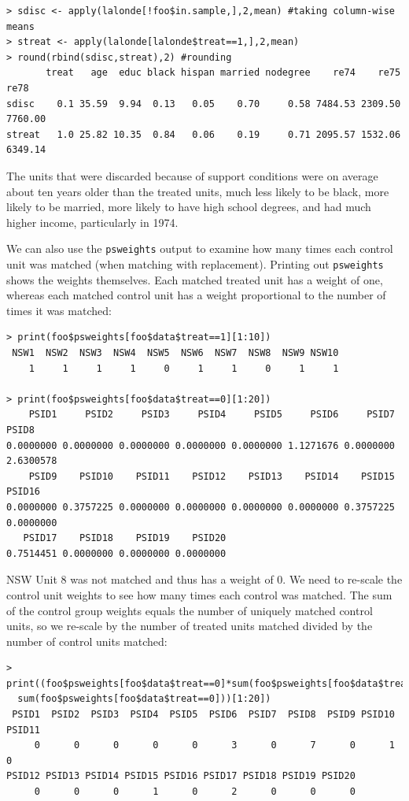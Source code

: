 \documentclass[oneside,letterpaper,titlepage]{article}
\begin{document}
\begin{verbatim}
> sdisc <- apply(lalonde[!foo$in.sample,],2,mean) #taking column-wise means
> streat <- apply(lalonde[lalonde$treat==1,],2,mean)
> round(rbind(sdisc,streat),2) #rounding
       treat   age  educ black hispan married nodegree    re74    re75    re78
sdisc    0.1 35.59  9.94  0.13   0.05    0.70     0.58 7484.53 2309.50 7760.00
streat   1.0 25.82 10.35  0.84   0.06    0.19     0.71 2095.57 1532.06 6349.14
\end{verbatim}

The units that were discarded because of support conditions were on
average about ten years older than the treated units, much less
likely to be black, more likely to be married, more likely to
have high school degrees, and had much higher income, particularly in
1974.

We can also use the {\tt psweights} output to examine how many times
each control unit was matched (when matching with replacement).
Printing out {\tt psweights} shows the weights themselves. Each
matched treated unit has a weight of one, whereas each matched control
unit has a weight proportional to the number of times it was matched:

\begin{verbatim}
> print(foo$psweights[foo$data$treat==1][1:10])
 NSW1  NSW2  NSW3  NSW4  NSW5  NSW6  NSW7  NSW8  NSW9 NSW10
    1     1     1     1     0     1     1     0     1     1

> print(foo$psweights[foo$data$treat==0][1:20])
    PSID1     PSID2     PSID3     PSID4     PSID5     PSID6     PSID7     PSID8
0.0000000 0.0000000 0.0000000 0.0000000 0.0000000 1.1271676 0.0000000 2.6300578
    PSID9    PSID10    PSID11    PSID12    PSID13    PSID14    PSID15    PSID16
0.0000000 0.3757225 0.0000000 0.0000000 0.0000000 0.0000000 0.3757225 0.0000000
   PSID17    PSID18    PSID19    PSID20
0.7514451 0.0000000 0.0000000 0.0000000
\end{verbatim}

NSW Unit 8 was not matched and thus has a weight of 0.  We need to
re-scale the control unit weights to see how many times each control
was matched.  The sum of the control group weights equals the
number of uniquely matched control units, so we re-scale by the number
of treated units matched divided by the number of control units
matched:

\begin{verbatim}
> print((foo$psweights[foo$data$treat==0]*sum(foo$psweights[foo$data$treat==1])/
  sum(foo$psweights[foo$data$treat==0]))[1:20])
 PSID1  PSID2  PSID3  PSID4  PSID5  PSID6  PSID7  PSID8  PSID9 PSID10 PSID11
     0      0      0      0      0      3      0      7      0      1      0
PSID12 PSID13 PSID14 PSID15 PSID16 PSID17 PSID18 PSID19 PSID20
     0      0      0      1      0      2      0      0      0
\end{verbatim}
\end{document}

